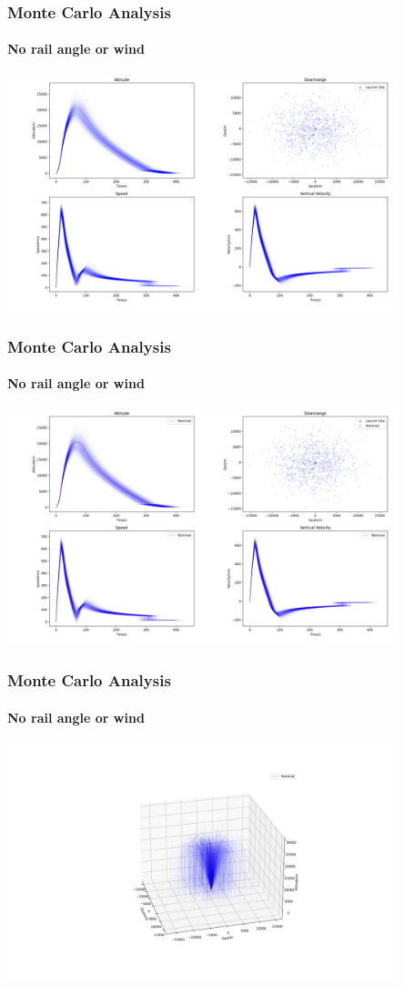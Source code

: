 \documentclass{beamer}
\begin{document}
    \begin{frame}
        \frametitle{Monte Carlo Analysis}
        \framesubtitle{No rail angle or wind}
        \includegraphics[width=0.85\textwidth]{images/stats_example1.png}
    \end{frame}
    \begin{frame}
        \frametitle{Monte Carlo Analysis}
        \framesubtitle{No rail angle or wind}
        \includegraphics[width=0.85\textwidth]{images/stats_example1_with_nom.png}
    \end{frame}
    \begin{frame}
        \frametitle{Monte Carlo Analysis}
        \framesubtitle{No rail angle or wind}
        \includegraphics[width=0.85\textwidth]{images/stats_example2_with_nom.png}
    \end{frame}
\end{document}
